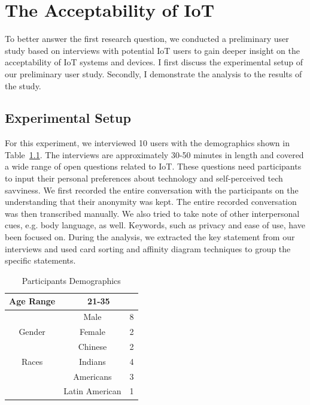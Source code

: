 
\chapter{The Acceptability of IoT}\label{chapter:Acceptability}

To better answer the first research question, we conducted  a preliminary user study based on interviews with potential IoT users to gain deeper insight on the acceptability of IoT systems and devices. I first discuss the experimental setup of our preliminary user study. Secondly, I demonstrate the analysis to the results of the study.

\section{Experimental Setup}

For this experiment, we interviewed 10 users with the demographics shown in Table~\ref{tab:demographics1}. The interviews are approximately 30-50 minutes in length and covered a wide range of open questions related to IoT. These questions need participants to input their personal preferences about technology and self-perceived tech savviness. We first recorded the entire conversation with the participants on the understanding that their anonymity was kept. The entire recorded conversation was then transcribed manually. We also tried to take note of other interpersonal cues, e.g. body language, as well. Keywords, such as privacy and ease of use, have been focused on. During the analysis, we extracted the key statement from our interviews and used card sorting and affinity diagram techniques to group the specific statements.

\begin {table}
\caption {Participants Demographics} \label{tab:demographics1}
\vspace{8pt}
\begin{center}
	\begin{tabular}{|c|c|c|}
		\hline
		Age Range & \multicolumn{2}{c|}{ 21-35 }\\
		\hline
		& Male & 8 \\
		\cline{2-3}
		Gender    & Female & 2 \\
		\hline
		& Chinese & 2 \\
		\cline{2-3}
		Races 	  & Indians & 4 \\
		\cline{2-3}
		& Americans & 3 \\
		\cline{2-3}
		& Latin American & 1\\
		\hline
	\end{tabular}
\end{center}
\end {table}



